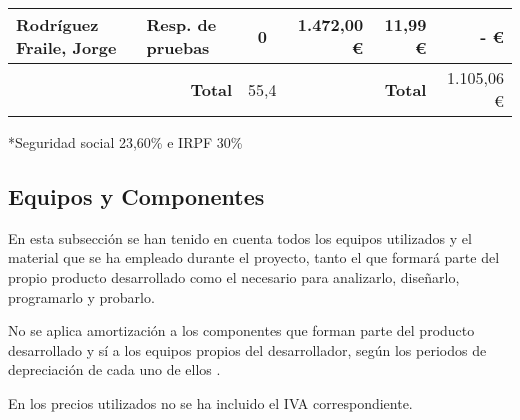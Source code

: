 \begin{table}[H]
{\begin{tabular}{ll|c|rr|r|}
			\multicolumn{1}{|l|}{Rodríguez Fraile, Jorge}                             & Resp. de pruebas                                            & 0                                      & \multicolumn{1}{r|}{1.472,00 €}                              & 11,99 €                                                                              & -   €                                                                                \\ \hline
			                                                                          & \multicolumn{1}{r|}{\textbf{Total}}                         & 55,4                                   & \multicolumn{1}{l}{}                                         & \textbf{Total}                                                                       & 1.105,06 €                                                                           \\ \cline{3-3} \cline{6-6}
		\end{tabular}%
	}
\end{table}

*Seguridad social 23,60\%\cite{noauthor_seguridad_nodate} e IRPF 30\%\cite{trecet_irpf_nodate}

\subsection{Equipos y Componentes}
En esta subsección se han tenido en cuenta todos los equipos utilizados y el material que se ha empleado durante el proyecto, tanto el que formará parte del propio producto desarrollado como el necesario para analizarlo, diseñarlo, programarlo y probarlo.

No se aplica amortización a los componentes que forman parte del producto desarrollado y sí a los equipos propios del desarrollador, según los periodos de depreciación de cada uno de ellos \cite{thiebaud_-muller_service_2018}.

En los precios utilizados no se ha incluido el IVA correspondiente.

